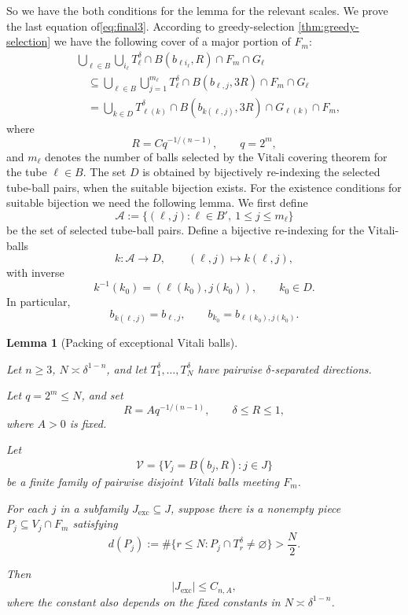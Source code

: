 \documentclass[11pt, letterpaper]{nyjm}
\newtheorem{lemma}[theorem]{Lemma}
\begin{document}
	So we have the both conditions for the lemma for the relevant scales.
	We prove the last equation of\eqref{eq:final3}.
	According to greedy-selection \ref{thm:greedy-selection} we have the following cover of a major portion of $F_m$: 
	\[
	\begin{aligned}
		&\bigcup_{\ell\in B}\bigcup_{i_\ell}
		T_\ell^\delta
		\cap B(b_{\ell i_\ell},R)
		\cap F_m
		\cap G_\ell\\
		&\quad\subseteq
		\bigcup_{\ell\in B}\bigcup_{j=1}^{m_\ell}
		T_\ell^\delta
		\cap B(b_{\ell, j},3R)
		\cap F_m
		\cap G_\ell\\
		&\quad=
		\bigcup_{k\in D}
		T_{\ell(k)}^\delta
		\cap B(b_{k(\ell,j)},3R)
		\cap G_{\ell(k)}
		\cap F_m,
	\end{aligned}
	\]
	where
	\[
	R=Cq^{-1/(n-1)},\qquad q=2^m,
	\]
	and $m_\ell$ denotes the number of balls selected by
	the Vitali covering theorem for the tube $\ell\in B$.
	The set $D$ is obtained by bijectively re-indexing the
	selected tube-ball pairs, when the suitable bijection exists.
	For the existence conditions for suitable bijection we need the following lemma.
	We first define 
	\[
	\mathcal A
	:=
	\{(\ell,j):\ell\in B',\ 1\le j\le m_\ell\}
	\]
	be the set of selected tube-ball pairs.
	Define a bijective re-indexing for the Vitali- balls
	\[
	k:\mathcal A\longrightarrow D,
	\qquad
	(\ell,j)\longmapsto k(\ell,j),
	\]
	with inverse
	\[
	k^{-1}(k_0)
	=
	(\ell(k_0),j(k_0)),
	\qquad k_0\in D.
	\]
	In particular,
	\[
	b_{k(\ell,j)}=b_{\ell,j},
	\qquad
	b_{k_0}=b_{\ell(k_0),j(k_0)}.
	\]
	
	
	\begin{lemma}[Packing of exceptional Vitali balls]
		\label{lem:exceptional-vitali}
		
		Let $n\ge 3$, $N\asymp\delta^{1-n}$,
		and let $T_1^\delta,\ldots,T_N^\delta$
		have pairwise $\delta$-separated directions.
		
		Let $q=2^m\le N$, and set
		\[
		R=Aq^{-1/(n-1)},\qquad
		\delta\le R\le 1,
		\]
		where $A>0$ is fixed.
		
		Let
		\[
		\mathcal V=\{V_j=B(b_j,R):j\in J\}
		\]
		be a finite family of pairwise disjoint
		Vitali balls meeting $F_m$.
		
		For each $j$ in a subfamily
		$J_{\mathrm{exc}}\subseteq J$, suppose
		there is a nonempty piece
		$P_j\subseteq V_j\cap F_m$ satisfying
		\[
		d(P_j):=
		\#\{r\le N:P_j\cap T_r^\delta
		\ne\varnothing\}>\frac N2.
		\]
		
		Then
		\[
		\boxed{|J_{\mathrm{exc}}|\le C_{n,A},}
		\]
		where the constant also depends on
		the fixed constants in
		$N\asymp\delta^{1-n}$.
	\end{lemma}
	
\end{document}
